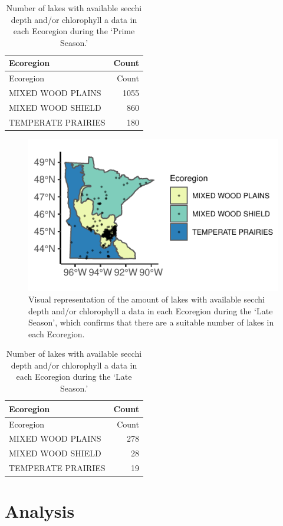 \documentclass[12pt,]{article}
\begin{document}
\begin{longtable}[]{@{}lr@{}}
\caption{Number of lakes with available secchi depth and/or chlorophyll
a data in each Ecoregion during the `Prime Season.'}\tabularnewline
\toprule
Ecoregion & Count\tabularnewline
\midrule
\endfirsthead
\toprule
Ecoregion & Count\tabularnewline
\midrule
\endhead
MIXED WOOD PLAINS & 1055\tabularnewline
MIXED WOOD SHIELD & 860\tabularnewline
TEMPERATE PRAIRIES & 180\tabularnewline
\bottomrule
\end{longtable}

\begin{figure}
\centering
\includegraphics{Bollt_Greif_Raby_Roth_Project_Final_files/figure-latex/unnamed-chunk-15-1.pdf}
\caption{Visual representation of the amount of lakes with available
secchi depth and/or chlorophyll a data in each Ecoregion during the
`Late Season', which confirms that there are a suitable number of lakes
in each Ecoregion.}
\end{figure}

\begin{longtable}[]{@{}lr@{}}
\caption{Number of lakes with available secchi depth and/or chlorophyll
a data in each Ecoregion during the `Late Season.'}\tabularnewline
\toprule
Ecoregion & Count\tabularnewline
\midrule
\endfirsthead
\toprule
Ecoregion & Count\tabularnewline
\midrule
\endhead
MIXED WOOD PLAINS & 278\tabularnewline
MIXED WOOD SHIELD & 28\tabularnewline
TEMPERATE PRAIRIES & 19\tabularnewline
\bottomrule
\end{longtable}

\newpage

\hypertarget{analysis}{%
\section{Analysis}\label{analysis}}
\end{document}
